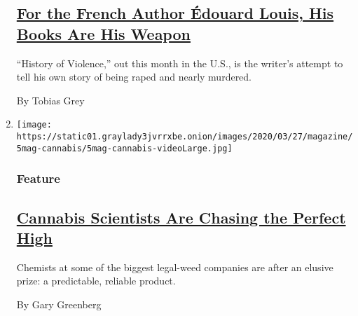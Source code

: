 \begin{enumerate}
{  \subsection{\texorpdfstring{\href{/2018/06/19/books/edouard-louis-history-of-violence.html}{For
  the French Author Édouard Louis, His Books Are His
  Weapon}}{For the French Author Édouard Louis, His Books Are His Weapon}}\label{for-the-french-author-uxe9douard-louis-his-books-are-his-weapon}}

  ``History of Violence,'' out this month in the U.S., is the writer's
  attempt to tell his own story of being raped and nearly murdered.

  By Tobias Grey
\item
  \texttt{[image: https://static01.graylady3jvrrxbe.onion/images/2020/03/27/magazine/5mag-cannabis/5mag-cannabis-videoLarge.jpg]}

  \hypertarget{feature}{%
  \subsubsection{Feature}\label{feature}}

  \hypertarget{cannabis-scientists-are-chasing-the-perfect-high}{%
  \subsection{\texorpdfstring{\href{/2020/04/01/magazine/cannabis-science.html}{Cannabis
  Scientists Are Chasing the Perfect
  High}}{Cannabis Scientists Are Chasing the Perfect High}}\label{cannabis-scientists-are-chasing-the-perfect-high}}

  Chemists at some of the biggest legal-weed companies are after an
  elusive prize: a predictable, reliable product.

  By Gary Greenberg
\end{enumerate}

